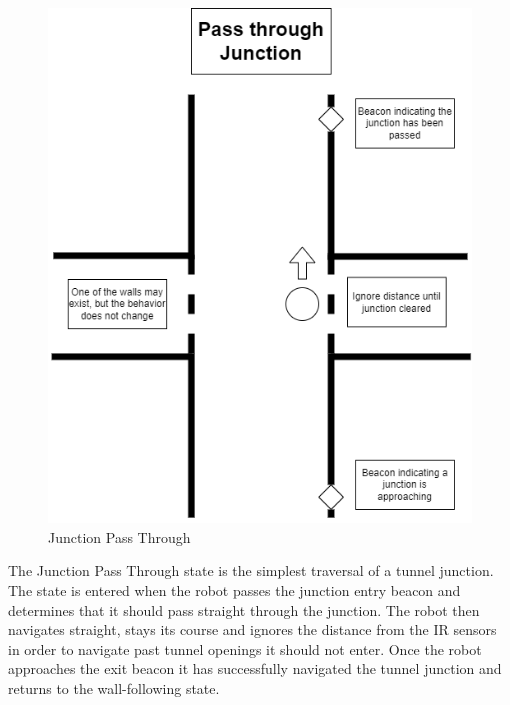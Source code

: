 \documentclass[12pt]{report}
\begin{document}
\begin{figure}[H]
\caption{Junction Pass Through}
\centering
\includegraphics[scale=0.6]{images/Junction Diagrams Pass Through.png}
\centering
\end{figure}

The Junction Pass Through state is the simplest traversal of a tunnel junction. The state is entered when the robot passes the junction entry beacon and determines that it should pass straight through the junction. The robot then navigates straight, stays its course and ignores the distance from the IR sensors in order to navigate past tunnel openings it should not enter. Once the robot approaches the exit beacon it has successfully navigated the tunnel junction and returns to the wall-following state.
\end{document}
